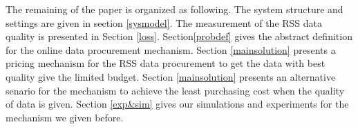 \documentclass[10pt,conference,compsocconf,letterpaper]{IEEEtran}
\begin{document}
The remaining of the paper is organized as following. The system structure and settings are given in section \ref{sysmodel}. The measurement of the RSS data quality is presented in Section \ref{loss}. Section\ref{probdef}  gives the abstract definition for the online data procurement mechanism. Section \ref{mainsolution} presents a pricing mechanism for the RSS data procurement to get the data with best quality give the limited budget. Section \ref{mainsolution} presents an alternative senario for the mechanism to achieve the least purchasing cost when the quality of data is given. Section \ref{exp&sim} gives our simulations and experiments for the mechanism we given before.



%
\end{document}
